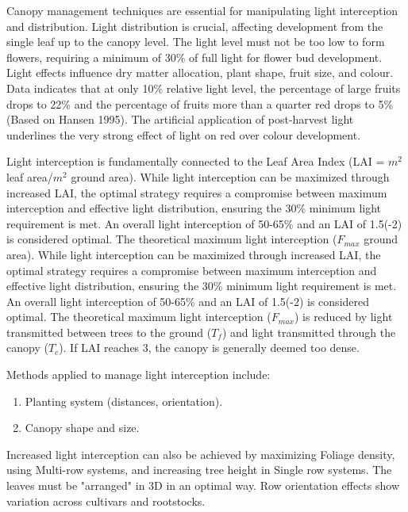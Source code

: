 \vspace{0.5em}
Canopy management techniques are essential for manipulating light interception and distribution. Light distribution is crucial, affecting development from the single leaf up to the canopy level. The light level must not be too low to form flowers, requiring a minimum of 30\% of full light for flower bud development. Light effects influence dry matter allocation, plant shape, fruit size, and colour. Data indicates that at only 10\% relative light level, the percentage of large fruits drops to 22\% and the percentage of fruits more than a quarter red drops to 5\% (Based on Hansen 1995). The artificial application of post-harvest light underlines the very strong effect of light on red over colour development.

\vspace{0.5em}
Light interception is fundamentally connected to the Leaf Area Index (LAI = $m^2$
leaf area/$m^2$ ground area). While light interception can be maximized through increased LAI, the optimal strategy requires a compromise between maximum interception and effective light distribution, ensuring the 30\% minimum light requirement is met. An overall light interception of 50-65\% and an LAI of 1.5(-2) is considered optimal. The theoretical maximum light interception ($F_{max}$ ground area). While light interception can be maximized through increased LAI, the optimal strategy requires a compromise between maximum interception and effective light distribution, ensuring the 30\% minimum light requirement is met. An overall light interception of 50-65\% and an LAI of 1.5(-2) is considered optimal. The theoretical maximum light interception ($F_{max}$) is reduced by light transmitted between trees to the ground ($T_f$) and light transmitted through the canopy ($T_c$). If LAI reaches 3, the canopy is generally deemed too dense.

\vspace{0.5em}
Methods applied to manage light interception include: 
\begin{enumerate} 
    \item Planting system (distances, orientation). 
    \item Canopy shape and size. 
\end{enumerate} 

\vspace{0.5em}
Increased light interception can also be achieved by maximizing Foliage density, using Multi-row systems, and increasing tree height in Single row systems. The leaves must be "arranged" in 3D in an optimal way. Row orientation effects show variation across cultivars and rootstocks.

